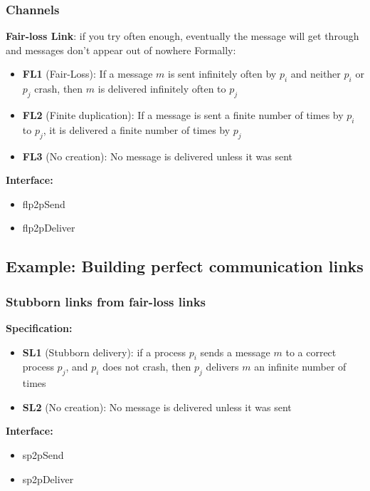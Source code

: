 \documentclass{scrartcl}
\begin{document}
\subsubsection{Channels}
\textbf{Fair-loss Link}: if you try often enough, eventually the message will get through and messages don't appear out of nowhere
Formally:
\begin{itemize}
    \item
        \textbf{FL1} (Fair-Loss): If a message \(m\) is sent infinitely often by \(p_i\) and neither \(p_i\) or \(p_j\) crash, then \(m\) is delivered infinitely often to \(p_j\) 
    \item
        \textbf{FL2} (Finite duplication): If a message is sent a finite number of times by \(p_i\) to \(p_j\), it is delivered a finite number of times by \(p_j\)
    \item
        \textbf{FL3} (No creation): No message is delivered unless it was sent
\end{itemize}

\textbf{Interface:}
\begin{itemize}
    \item
        flp2pSend
    \item
        flp2pDeliver
\end{itemize}

\subsection{Example: Building perfect communication links}
\subsubsection{Stubborn links from fair-loss links}
\textbf{Specification:}
\begin{itemize}
    \item
        \textbf{SL1} (Stubborn delivery): if a process \(p_i\) sends a message \(m\) to a correct process \(p_j\), and \(p_i\) does not crash, then \(p_j\) delivers \(m\) an infinite number of times 
    \item
        \textbf{SL2} (No creation): No message is delivered unless it was sent
\end{itemize}

\textbf{Interface:}
\begin{itemize}
    \item
        sp2pSend
    \item
        sp2pDeliver
\end{itemize}
\end{document}
